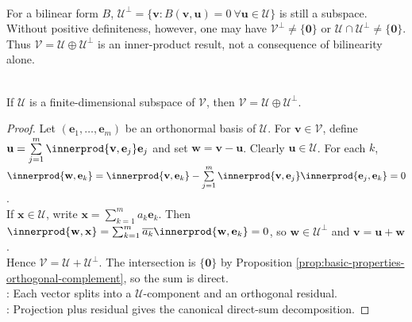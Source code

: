 \begin{remark} \label{rem:orthogonal-complements-definiteness-warning} \\
For a bilinear form $B$, $\mathcal{U}^{\perp}=\{\mathbf{v}:B(\mathbf{v},\mathbf{u})=0\ \forall\mathbf{u}\in\mathcal{U}\}$ is still a subspace.\\
Without positive definiteness, however, one may have $\mathcal{V}^{\perp}\neq\{\mathbf{0}\}$ or $\mathcal{U}\cap\mathcal{U}^{\perp}\neq\{\mathbf{0}\}$.\\
Thus $\mathcal{V}=\mathcal{U}\oplus\mathcal{U}^{\perp}$ is an inner-product result, not a consequence of bilinearity alone.
\end{remark}

\begin{theorem} \label{thm:orthogonal-direct-sum-decomposition} \\
If $\mathcal{U}$ is a finite-dimensional subspace of $\mathcal{V}$, then $\mathcal{V}=\mathcal{U}\oplus\mathcal{U}^{\perp}$.
\begin{proof}
Let $(\mathbf{e}_1,\ldots,\mathbf{e}_m)$ be an orthonormal basis of $\mathcal{U}$. For $\mathbf{v}\in\mathcal{V}$, define $\mathbf{u}=\sum\limits_{j=1}^{m}\innerprod{\mathbf{v},\mathbf{e}_j}\mathbf{e}_j$ and set $\mathbf{w}=\mathbf{v}-\mathbf{u}$. Clearly $\mathbf{u}\in\mathcal{U}$. For each $k$, $\innerprod{\mathbf{w},\mathbf{e}_k} =\innerprod{\mathbf{v},\mathbf{e}_k} -\sum\limits_{j=1}^{m}\innerprod{\mathbf{v},\mathbf{e}_j}\innerprod{\mathbf{e}_j,\mathbf{e}_k} =0$.\\
If $\mathbf{x}\in\mathcal{U}$, write $\mathbf{x}=\sum_{k=1}^m a_k\mathbf{e}_k$. Then $\innerprod{\mathbf{w},\mathbf{x}}=\sum_{k=1}^m \overline{a_k}\innerprod{\mathbf{w},\mathbf{e}_k}=0$, so $\mathbf{w}\in\mathcal{U}^{\perp}$ and $\mathbf{v}=\mathbf{u}+\mathbf{w}$.\\
Hence $\mathcal{V}=\mathcal{U}+\mathcal{U}^{\perp}$. The intersection is $\{\mathbf{0}\}$ by Proposition \ref{prop:basic-properties-orthogonal-complement}, so the sum is direct.\\
: Each vector splits into a $\mathcal{U}$-component and an orthogonal residual.\\
: Projection plus residual gives the canonical direct-sum decomposition.
\end{proof}
\end{theorem}

